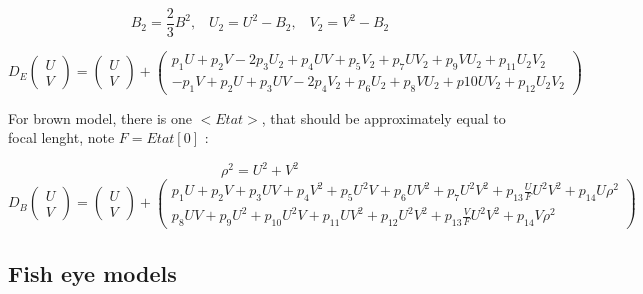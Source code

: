 \begin{equation}
     B_2 = \frac{2}{3} B^2
    ,\;\;\;   U_2 = U^2 - B_2
    ,\;\;\;   V_2 = V^2 - B_2
\end{equation}


\begin{equation}
  D_E \begin{pmatrix}  U \\  V  \end{pmatrix} =
      \begin{pmatrix}  U \\  V  \end{pmatrix}
   +  \begin{pmatrix}
              p_1 U + p_2 V -2p_3 U_2 + p_4 UV +p_5 V_2 +p_7 UV_2 +p_9 VU_2    + p_{11} U_2 V_2   \\
              -p_1V + p_2 U + p_3 UV  -2p_4V_2 +p_6 U_2 +p_8 V U_2+p{10} UV_2  + p_{12} U_2 V_2
       \end{pmatrix}
\end{equation}


For brown model, there is one $<Etat>$, that should be approximately equal to focal lenght,
note $F=Etat[0]$ :

\begin{equation}
      \rho^2 =  U^2 + V^2
\end{equation}
\begin{equation}
  D_B \begin{pmatrix}  U \\  V  \end{pmatrix} =
      \begin{pmatrix}  U \\  V  \end{pmatrix}
   +  \begin{pmatrix}
              p_1 U + p_2 V  + p_3 UV + p_4 V^2 + p_5 U^2 V + p_6 UV^2 + p_7 U^2V^2 + p_{13}\frac{U}{F}U^2V^2 + p_{14} U \rho^2   \\
              p_8 UV + p_9 U^2 +p_{10}U^2V + p_{11}UV^2 + p_{12} U^2V^2 + p_{13}\frac{V}{F}U^2V^2 +  p_{14} V \rho^2
       \end{pmatrix}
\end{equation}




\subsection{Fish eye models}

